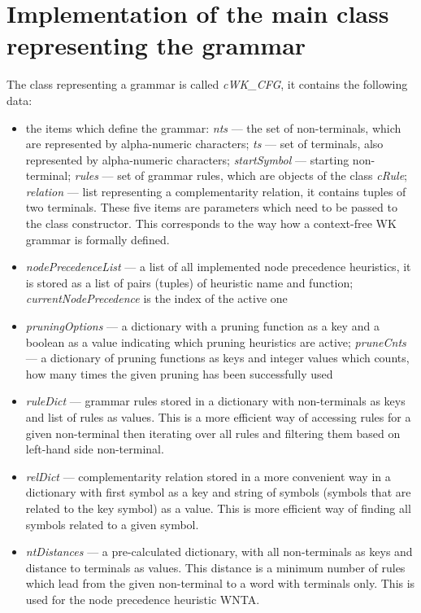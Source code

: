 \section{Implementation of the main class representing the grammar}
The class representing a grammar is called \textit{cWK\_CFG}, it contains the following data:
\begin{itemize}
  \item{the items which define the grammar: \textit{nts} --- the set of non-terminals, which are represented by alpha-numeric characters; \textit{ts} --- set of terminals, also represented by alpha-numeric characters; \textit{startSymbol} --- starting non-terminal; \textit{rules} --- set of grammar rules, which are objects of the class \textit{cRule}; \textit{relation} --- list representing a complementarity relation, it contains tuples of two terminals. These five items are parameters which need to be passed to the class constructor. This corresponds to the way how a context-free WK grammar is formally defined.}

  \item{\textit{nodePrecedenceList} --- a list of all implemented node precedence heuristics, it is stored as a list of pairs (tuples) of heuristic name and function; \textit{currentNodePrecedence} is the index of the active one}

  \item{\textit{pruningOptions} --- a dictionary with a pruning function as a key and a boolean as a value indicating which pruning heuristics are active; \textit{pruneCnts} --- a dictionary of pruning functions as keys and integer values which counts, how many times the given pruning has been successfully used}

  \item{\textit{ruleDict} --- grammar rules stored in a dictionary with non-terminals as keys and list of rules as values. This is a more efficient way of accessing rules for a given non-terminal then iterating over all rules and filtering them based on left-hand side non-terminal.}

  \item{\textit{relDict} --- complementarity relation stored in a more convenient way in a dictionary with first symbol as a key and string of symbols (symbols that are related to the key symbol) as a value. This is more efficient way of finding all symbols related to a given symbol.}

  \item{\textit{ntDistances} --- a pre-calculated dictionary, with all non-terminals as keys and distance to terminals as values. This distance is a minimum number of rules which lead from the given non-terminal to a word with terminals only. This is used for the node precedence heuristic WNTA.}


\end{itemize}
